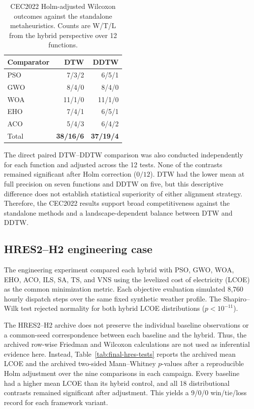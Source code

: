 \documentclass[review]{elsarticle}
\begin{document}
\begin{table}[htbp]
\centering
\caption{CEC2022 Holm-adjusted Wilcoxon outcomes against the standalone
metaheuristics. Counts are W/T/L from the hybrid perspective over 12
functions.}
\label{tab:final-cec-wtl}
\begin{tabular}{lrr}
\toprule
Comparator & DTW & DDTW \\
\midrule
PSO & 7/3/2  & 6/5/1 \\
GWO & 8/4/0  & 8/4/0 \\
WOA & 11/1/0 & 11/1/0 \\
EHO & 7/4/1  & 6/5/1 \\
ACO & 5/4/3  & 6/4/2 \\
\midrule
Total & \textbf{38/16/6} & \textbf{37/19/4} \\
\bottomrule
\end{tabular}
\end{table}

The direct paired DTW--DDTW comparison was also conducted independently for
each function and adjusted across the 12 tests. None of the contrasts remained
significant after Holm correction ($0/12$). DTW had the lower mean at full
precision on seven functions and DDTW on five, but this descriptive difference
does not establish statistical superiority of either alignment strategy.
Therefore, the CEC2022 results support broad competitiveness against the
standalone methods and a landscape-dependent balance between DTW and DDTW.

\subsection{HRES2--H2 engineering case}
\label{sec:final-stat-hres2}

The engineering experiment compared each hybrid with PSO, GWO, WOA, EHO,
ACO, ILS, SA, TS, and VNS using the levelized cost of electricity (LCOE)
as the common minimization metric. Each objective evaluation simulated 8,760
hourly dispatch steps over the same fixed synthetic weather profile. The
Shapiro--Wilk test rejected normality for both hybrid LCOE distributions
($p<10^{-11}$).

The HRES2--H2 archive does not preserve the individual baseline observations
or a common-seed correspondence between each baseline and the hybrid. Thus,
the archived row-wise Friedman and Wilcoxon calculations are not used as
inferential evidence here. Instead, Table~\ref{tab:final-hres-tests} reports
the archived mean LCOE and the archived two-sided Mann--Whitney $p$-values
after a reproducible Holm adjustment over the nine comparisons in each
campaign. Every baseline had a higher mean LCOE than its hybrid control, and
all 18 distributional contrasts remained significant after adjustment. This
yields a 9/0/0 win/tie/loss record for each framework variant.
\end{document}

